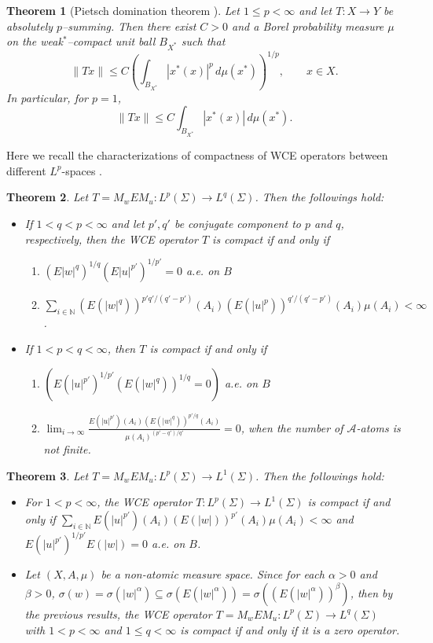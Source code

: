 \documentclass{amsart}
\newtheorem{thm}{Theorem}[section]
\theoremstyle{definition}\newtheorem{defn}[thm]{Definition}
\theoremstyle{remark}
\numberwithin{equation}{section}
\begin{document}
\begin{thm}[Pietsch domination theorem {\cite[Theorem~2.12]{Diestel1995}}]\label{thm:Pietsch}
Let $1\le p<\infty$ and let $T:X\to Y$ be absolutely $p$--summing.
Then there exist $C>0$ and a Borel probability measure $\mu$ on the weak$^{*}$--compact unit ball $B_{X^*}$ such that
\[
\|Tx\|
\le C\left(\int_{B_{X^*}} |x^*(x)|^p\,d\mu(x^*)\right)^{1/p},
\qquad x\in X.
\]
In particular, for $p=1$,
\[
\|Tx\|\le C\int_{B_{X^*}} |x^*(x)|\,d\mu(x^*).
\]
\end{thm}
Here we recall the characterizations of compactness of WCE operators between different $L^p$-spaces \cite{Estaremi2014}.
\begin{thm}
Let $T=M_wEM_u: L^p(\Sigma) \to L^q(\Sigma)$. Then the followings hold:
\begin{itemize}
\item If $1< q< p< \infty$ and let $p',q'$ be conjugate component to \(p\) and \(q\), respectively, then the WCE operator $T$ is compact if and only if
\begin{enumerate}
	\item \((E|w|^{q})^{1 / q}(E|u|^{p'})^{1 / p'} = 0\) a.e. on $B$
	\item \(\sum_{i\in \mathbb{N}}(E(|w|^q))^{p'q' / (q' - p')}(A_i)(E(|u|^p))^{q' / (q'- p')}(A_i)\mu (A_i)< \infty\).
\end{enumerate}
\item If \(1 < p < q < \infty\), then $T$ is compact if and only if
\begin{enumerate}
	\item $(E(|u|^{p'})^{1 / p'}(E(|w|^q))^{1 / q} = 0)$ a.e. on $B$ 
	\item \(\lim_{i\to \infty}\frac{E(|u|^{p'})(A_i)(E(|w|^q))^{p' / q}(A_i)}{\mu(A_i)^{(p' - q') / q'}} = 0\), when the number of \(\mathcal{A}\)-atoms is not finite.
\end{enumerate}
 \end{itemize}
 \end{thm}
 \begin{thm}
Let $T=M_wEM_u: L^p(\Sigma) \to L^1(\Sigma)$. Then the followings hold:
\begin{itemize}
\item 
For $1<p<\infty$, the WCE operator $T: L^p(\Sigma) \to L^{1}(\Sigma)$ is compact if and only if \(\sum_{i\in \mathbb{N}}E(|u|^{p'})(A_{i})(E(|w|))^{p'}(A_{i})\mu (A_{i})< \infty\) and \(E(|u|^{p'})^{1 / p'}E(|w|) = 0\) a.e. on \(B\).

\item Let \((X,A,\mu)\) be a non-atomic measure space. Since for each \(\alpha >0\) and \(\beta >0\), \(\sigma (w) = \sigma (|w|^{\alpha})\subseteq \sigma (E(|w|^{\alpha})) = \sigma ((E(|w|^{\alpha}))^{\beta})\), then by the previous results, the WCE operator $T = M_w E M_u : L^p(\Sigma) \to L^q(\Sigma)$ with \(1< p< \infty\) and \(1\leq q< \infty\) is compact if and only if it is a zero operator.
\end{itemize}
\end{thm} 
\end{document}
